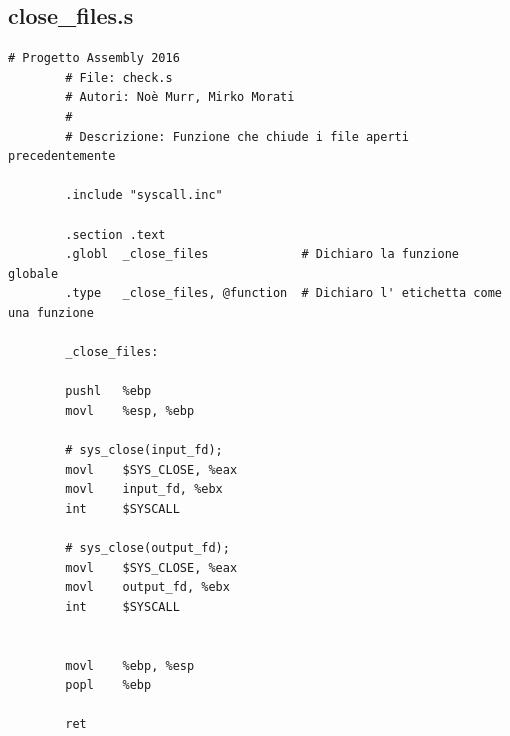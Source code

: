 \documentclass[a4paper,11pt]{article}
\begin{document}
		\subsection{close\_files.s}
		\begin{lstlisting}[language=MyAssembler, style=MyAsm]
		# Progetto Assembly 2016
		# File: check.s
		# Autori: Noè Murr, Mirko Morati
		#
		# Descrizione: Funzione che chiude i file aperti precedentemente
		
		.include "syscall.inc"
		
		.section .text
		.globl 	_close_files 			 # Dichiaro la funzione globale
		.type 	_close_files, @function  # Dichiaro l' etichetta come una funzione
		
		_close_files:
		
		pushl	%ebp
		movl 	%esp, %ebp
		
		# sys_close(input_fd);
		movl	$SYS_CLOSE, %eax
		movl	input_fd, %ebx
		int 	$SYSCALL
		
		# sys_close(output_fd);
		movl	$SYS_CLOSE, %eax
		movl	output_fd, %ebx
		int 	$SYSCALL
		
		
		movl    %ebp, %esp
		popl    %ebp
		
		ret
		\end{lstlisting}
		
	
\end{document}
